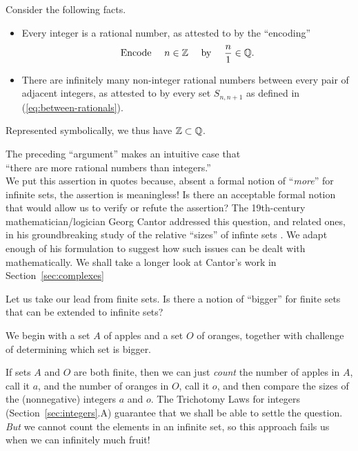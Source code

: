 \noindent Consider the following facts.
\begin{itemize}
\item
Every integer is a rational number, as attested to by the ``encoding''
\begin{equation}
\label{eq:ZintoQ}
\mbox{Encode } \ \ \ n \in \mathbb{Z} \ \ \ \mbox{ by } \ \ \ {n \over 1} \in \mathbb{Q} .
\end{equation}

\item
There are infinitely many non-integer rational numbers between every
pair of adjacent integers, as attested to by every set $S_{n,n+1}$ as
defined in (\ref{eq:between-rationals}).
\end{itemize}
Represented symbolically, we thus have $\mathbb{Z} \subset \mathbb{Q}$.

\medskip

\noindent
The preceding ``argument'' makes an intuitive case that \\
\hspace*{.35in}``there are more rational numbers than integers.'' \\ 
We put this assertion in quotes because, absent a formal notion of
``{\em more}'' for infinite sets, the assertion is meaningless!  Is
there an acceptable formal notion that would allow us to verify or
refute the assertion?  The 19th-century mathematician/logician Georg
Cantor addressed this question, and related ones, in his
groundbreaking study of the relative ``sizes'' of infinte sets
\cite{Cantor74,Cantor78}.  We adapt enough of his formulation to
suggest how such issues can be dealt with mathematically.  We shall
take a longer look at Cantor's work in Section~\ref{sec:complexes}

Let us take our lead from finite sets.  Is there a notion of
``bigger'' for finite sets that can be extended to infinite sets?

We begin with a set $A$ of apples and a set $O$ of oranges, together
with challenge of determining which set is bigger.

\medskip

If sets $A$ and $O$ are both finite, then we can just {\em count} the
number of apples in $A$, call it $a$, and the number of oranges in
$O$, call it $o$, and then compare the sizes of the (nonnegative)
integers $a$ and $o$.  The Trichotomy Laws for integers
(Section~\ref{sec:integers}.A) guarantee that we shall be able to
settle the question.  {\em But} we cannot count the elements in an
infinite set, so this approach fails us when we can infinitely much
fruit!

